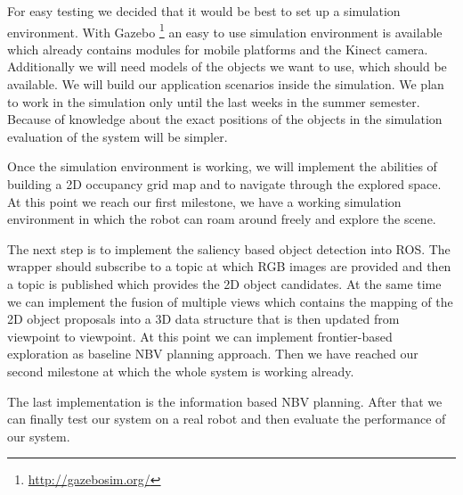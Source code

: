 \documentclass[a4paper,11pt,english]{article}
\begin{document}
For easy testing we decided that it would be best to set up a simulation environment.
With Gazebo \footnote{\url{http://gazebosim.org/}} an easy to use simulation environment is available which already contains modules for mobile platforms and the Kinect camera.
Additionally we will need models of the objects we want to use, which should be available.
We will build our application scenarios inside the simulation.
We plan to work in the simulation only until the last weeks in the summer semester.
Because of knowledge about the exact positions of the objects in the simulation evaluation of the system will be simpler.

Once the simulation environment is working, we will implement the abilities of building a 2D occupancy grid map and to navigate through the explored space.
At this point we reach our first milestone, we have a working simulation environment in which the robot can roam around freely and explore the scene.

The next step is to implement the saliency based object detection into ROS. The wrapper should subscribe to a topic at which RGB images are provided and then a topic is published which provides the 2D object candidates.
At the same time we can implement the fusion of multiple views which contains the mapping of the 2D object proposals into a 3D data structure that is then updated from viewpoint to viewpoint.
At this point we can implement frontier-based exploration as baseline NBV planning approach.
Then we have reached our second milestone at which the whole system is working already.

The last implementation is the information based NBV planning.
After that we can finally test our system on a real robot and then evaluate the performance of our system. 
\end{document}
